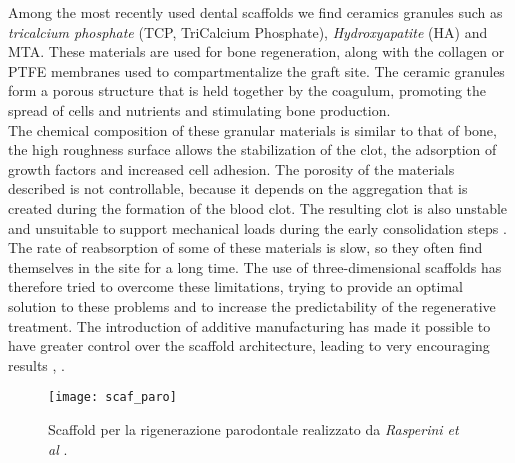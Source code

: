 Among the most recently used dental scaffolds we find ceramics granules such as \emph{tricalcium phosphate} (TCP, TriCalcium Phosphate), \emph{Hydroxyapatite} (HA) and MTA. These materials are used for bone regeneration, along with the collagen or PTFE membranes used to compartmentalize the graft site. The ceramic granules form a porous structure that is held together by the coagulum, promoting the spread of cells and nutrients and stimulating bone production. \\ The chemical composition of these granular materials is similar to that of bone, the high roughness surface allows the stabilization of the clot, the adsorption of growth factors and increased cell adhesion. The porosity of the materials described is not controllable, because it depends on the aggregation that is created during the formation of the blood clot. The resulting clot is also unstable and unsuitable to support mechanical loads during the early consolidation steps \parencite{Reference131}. The rate of reabsorption of some of these materials is slow, so they often find themselves in the site for a long time.
The use of three-dimensional scaffolds has therefore tried to overcome these limitations, trying to provide an optimal solution to these problems and to increase the predictability of the regenerative treatment. The introduction of additive manufacturing has made it possible to have greater control over the scaffold architecture, leading to very encouraging results \parencite{Reference136}, \parencite{Reference137}.\\
\begin{figure}[h]
\vspace{-10pt}
	\begin{center}
	\texttt{[image: scaf\_paro]}
    \caption{Scaffold per la rigenerazione parodontale realizzato da \emph{Rasperini et al} \parencite{Reference134}.}
    \label{fig:scaf_paro}
	\end{center}
\vspace{-20pt}
\end{figure}

